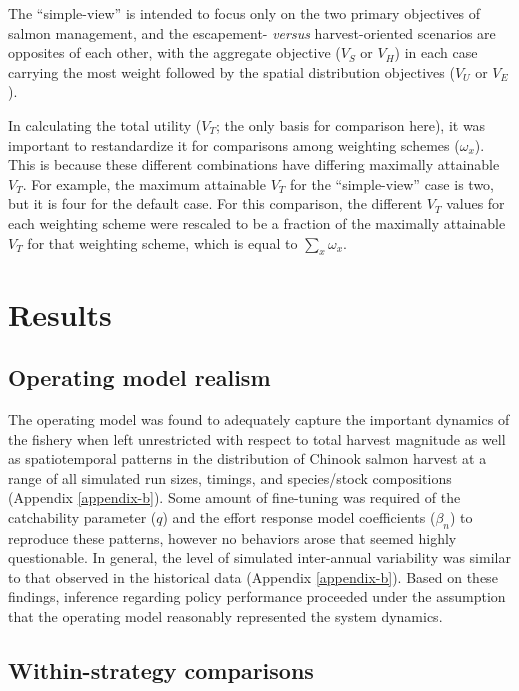 \documentclass[12pt,]{book}
\theoremstyle{definition}
\theoremstyle{definition}
\theoremstyle{definition}
\theoremstyle{remark}
\begin{document}
\noindent
The ``simple-view'' is intended to focus only on the two primary
objectives of salmon management, and the escapement- \emph{versus}
harvest-oriented scenarios are opposites of each other, with the
aggregate objective (\(V_S\) or \(V_H\)) in each case carrying the most
weight followed by the spatial distribution objectives (\(V_U\) or
\(V_E\)).

In calculating the total utility (\(V_T\); the only basis for comparison
here), it was important to restandardize it for comparisons among
weighting schemes (\(\omega_x\)). This is because these different
combinations have differing maximally attainable \(V_T\). For example,
the maximum attainable \(V_T\) for the ``simple-view'' case is two, but
it is four for the default case. For this comparison, the different
\(V_T\) values for each weighting scheme were rescaled to be a fraction
of the maximally attainable \(V_T\) for that weighting scheme, which is
equal to \(\sum_x \omega_x\).

\section{Results}\label{results-1}

\subsection{Operating model realism}\label{operating-model-realism}

\noindent
The operating model was found to adequately capture the important
dynamics of the fishery when left unrestricted with respect to total
harvest magnitude as well as spatiotemporal patterns in the distribution
of Chinook salmon harvest at a range of all simulated run sizes,
timings, and species/stock compositions (Appendix \ref{appendix-b}).
Some amount of fine-tuning was required of the catchability parameter
(\(q\)) and the effort response model coefficients (\(\beta_n\)) to
reproduce these patterns, however no behaviors arose that seemed highly
questionable. In general, the level of simulated inter-annual
variability was similar to that observed in the historical data
(Appendix \ref{appendix-b}). Based on these findings, inference
regarding policy performance proceeded under the assumption that the
operating model reasonably represented the system dynamics.

\subsection{Within-strategy
comparisons}\label{within-strategy-comparisons-1}
\end{document}
